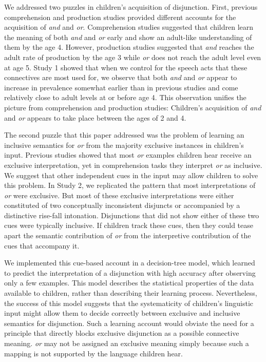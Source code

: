 \documentclass[10pt, letterpaper]{article}
\begin{document}
We addressed two puzzles in children's acquisition of disjunction.
First, previous comprehension and production studies provided different
accounts for the acquisition of \emph{and} and \emph{or}. Comprehension
studies suggested that children learn the meaning of both \emph{and} and
\emph{or} early and show an adult-like understanding of them by the age
4. However, production studies suggested that \emph{and} reaches the
adult rate of production by the age 3 while \emph{or} does not reach the
adult level even at age 5. Study 1 showed that when we control for the
speech acts that these connectives are most used for, we observe that
both \emph{and} and \emph{or} appear to increase in prevalence somewhat
earlier than in previous studies and come relatively close to adult
levels at or before age 4. This observation unifies the picture from
comprehension and production studies: Children's acquisition of
\emph{and} and \emph{or} appears to take place between the ages of 2 and
4.

The second puzzle that this paper addressed was the problem of learning
an inclusive semantics for \emph{or} from the majority exclusive
instances in children's input. Previous studies showed that most
\emph{or} examples children hear receive an exclusive interpretation,
yet in comprehension tasks they interpret \emph{or} as inclusive. We
suggest that other independent cues in the input may allow children to
solve this problem. In Study 2, we replicated the pattern that most
interpretations of \emph{or} were exclusive. But most of these exclusive
interpretations were either constituted of two conceptually inconsistent
disjuncts or accompanied by a distinctive rise-fall intonation.
Disjunctions that did not show either of these two cues were typically
inclusive. If children track these cues, then they could tease apart the
semantic contribution of \emph{or} from the interpretive contribution of
the cues that accompany it.

We implemented this cue-based account in a decision-tree model, which
learned to predict the interpretation of a disjunction with high
accuracy after observing only a few examples. This model describes the
statistical properties of the data available to children, rather than
describing their learning process. Nevertheless, the success of this
model suggests that the systematicity of children's linguistic input
might allow them to decide correctly between exclusive and inclusive
semantics for disjunction. Such a learning account would obviate the
need for a principle that directly blocks exclusive disjunction as a
possible connective meaning. \emph{or} may not be assigned an exclusive
meaning simply because such a mapping is not supported by the language
children hear.
\end{document}
